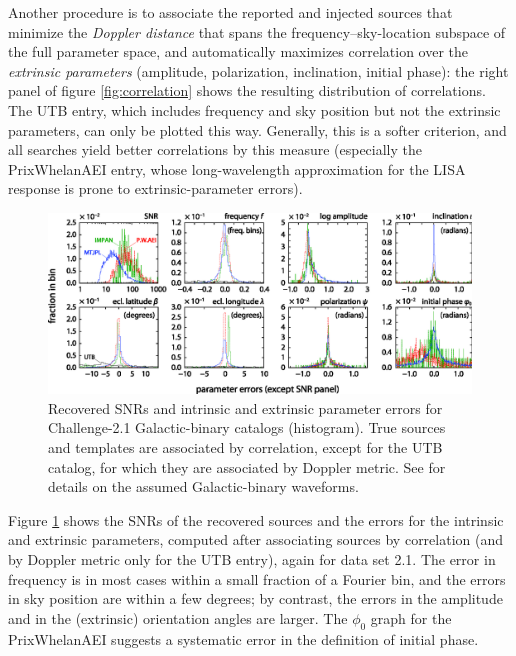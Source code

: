 \documentclass{iopart}
\begin{document}
Another procedure is to associate the reported and injected sources that minimize the \emph{Doppler distance} that spans the frequency--sky-location subspace of the full parameter space, and automatically maximizes correlation over the \emph{extrinsic parameters} (amplitude, polarization, inclination, initial phase): the right panel of figure \ref{fig:correlation} shows the resulting distribution of correlations. The UTB entry, which includes frequency and sky position but not the extrinsic parameters, can only be plotted this way. Generally, this is a softer criterion, and all searches yield better correlations by this measure (especially the PrixWhelanAEI entry,
whose long-wavelength approximation for the LISA response is prone to extrinsic-parameter errors).
%
\begin{figure}
\includegraphics[width=\textwidth]{Errors-b-2}
\vspace{-18pt}
\caption{Recovered SNRs and intrinsic and extrinsic parameter errors for Challenge-2.1 Galactic-binary catalogs (histogram). True sources and templates are associated by correlation, except for the UTB catalog, for which they are associated by Doppler metric. See \cite{mldcgwdaw2} for details on the assumed Galactic-binary waveforms.\label{fig:paramerrors}}
\vspace{-6pt}
\end{figure}

Figure \ref{fig:paramerrors} shows the SNRs of the recovered sources and the errors for the intrinsic and extrinsic parameters, computed after associating sources by correlation (and by Doppler metric only for the UTB entry), again for data set 2.1. The error in frequency is in most cases within a small fraction of a Fourier bin, and the errors in sky position are within a few degrees; by contrast, the errors in the amplitude and in the (extrinsic) orientation angles are larger. The $\phi_0$ graph for the PrixWhelanAEI suggests a systematic error in the definition of initial phase.
\end{document}
